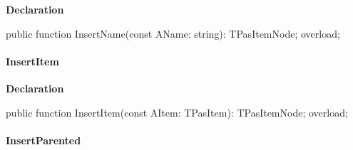 \documentclass{report}
\newif\ifpdf
\begin{document}
\label{PasDoc_HierarchyTree.TStringCardinalTree-InsertName}
\begin{list}{}{
\setlength{\itemindent}{0cm}
\setlength{\listparindent}{0cm}
\setlength{\leftmargin}{\evensidemargin}
\addtolength{\leftmargin}{\tmplength}
\settowidth{\labelsep}{X}
\addtolength{\leftmargin}{\labelsep}
\setlength{\labelwidth}{\tmplength}
}
\item[\textbf{Declaration}\hfill]
\ifpdf
\begin{flushleft}
\fi
\begin{ttfamily}
public function InsertName(const AName: string): TPasItemNode; overload;\end{ttfamily}

\ifpdf
\end{flushleft}
\fi

\end{list}
\paragraph*{InsertItem}\hspace*{\fill}

\label{PasDoc_HierarchyTree.TStringCardinalTree-InsertItem}
\begin{list}{}{
\setlength{\itemindent}{0cm}
\setlength{\listparindent}{0cm}
\setlength{\leftmargin}{\evensidemargin}
\addtolength{\leftmargin}{\tmplength}
\settowidth{\labelsep}{X}
\addtolength{\leftmargin}{\labelsep}
\setlength{\labelwidth}{\tmplength}
}
\item[\textbf{Declaration}\hfill]
\ifpdf
\begin{flushleft}
\fi
\begin{ttfamily}
public function InsertItem(const AItem: TPasItem): TPasItemNode; overload;\end{ttfamily}

\ifpdf
\end{flushleft}
\fi

\end{list}
\paragraph*{InsertParented}\hspace*{\fill}
\end{document}
